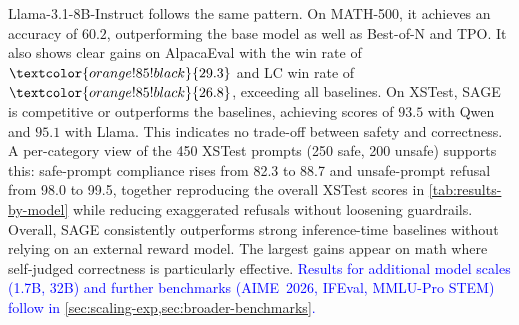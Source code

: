 \documentclass[letterpaper]{article} %
\newcommand{\method}{SAGE}
\begin{document}
Llama-3.1-8B-Instruct follows the same pattern. On MATH-500, it achieves an accuracy of \(60.2\), outperforming the base model as well as Best-of-N and TPO. It also shows clear gains on AlpacaEval with the win rate of \(\textcolor{orange!85!black}{29.3}\) and LC win rate of \(\textcolor{orange!85!black}{26.8}\), exceeding all baselines. On XSTest, \method{} is competitive or outperforms the baselines, achieving scores of \(93.5\) with Qwen and \(95.1\) with Llama. This indicates no trade-off between safety and correctness. \textcolor{green!50!black}{A per-category view of the 450 XSTest prompts (250 safe, 200 unsafe) supports this: safe-prompt compliance rises from \textcolor{orange!85!black}{82.3} to \textcolor{orange!85!black}{88.7} and unsafe-prompt refusal from 98.0 to 99.5, together reproducing the overall XSTest scores in \cref{tab:results-by-model} while reducing exaggerated refusals without loosening guardrails.} Overall, \method{} consistently outperforms strong inference-time baselines without relying on an external reward model. The largest gains appear on math where self-judged correctness is particularly effective. \textcolor{blue}{Results for additional model scales (1.7B, 32B) and further benchmarks (AIME~2026, IFEval, MMLU-Pro STEM) follow in \cref{sec:scaling-exp,sec:broader-benchmarks}.}
\end{document}
